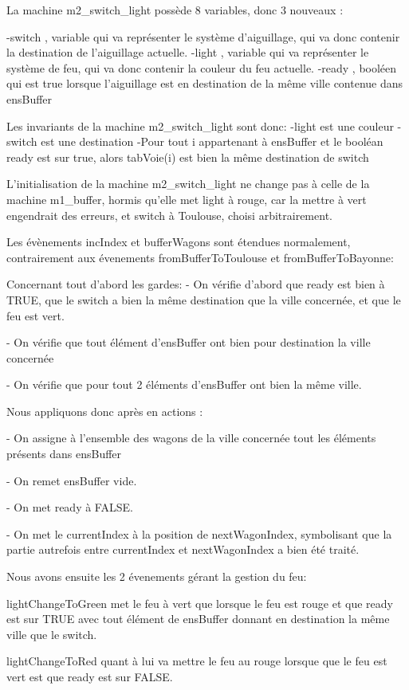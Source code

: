 La machine m2_switch_light possède 8 variables, donc 3 nouveaux :

-switch , variable qui va représenter le système d'aiguillage, qui va donc contenir la destination de l'aiguillage actuelle.
-light  , variable qui va représenter le système de feu, qui va donc contenir la couleur du feu actuelle.
-ready  , booléen qui est true lorsque l'aiguillage est en destination de la même ville contenue dans ensBuffer

Les invariants de la machine m2_switch_light sont donc:
    -light est une couleur
    -switch est une destination
    -Pour tout i appartenant à ensBuffer et le booléan ready est sur true, alors tabVoie(i) est bien la même destination de switch

L'initialisation de la machine m2_switch_light ne change pas à celle de la machine m1_buffer, hormis qu'elle met light à rouge, car la mettre à vert engendrait des erreurs, et switch à Toulouse, choisi arbitrairement.

Les évènements incIndex et bufferWagons sont étendues normalement, contrairement aux évenements fromBufferToToulouse et fromBufferToBayonne:

Concernant tout d'abord les gardes:
- On vérifie d'abord que ready est bien à TRUE, que le switch a bien la même destination que la ville concernée, et que le feu est vert.

- On vérifie que tout élément d'ensBuffer ont bien pour destination la ville concernée

- On vérifie que pour tout 2  éléments d'ensBuffer ont bien la même ville.

Nous appliquons donc après en actions :

- On assigne à l'ensemble des wagons de la ville concernée tout les éléments présents dans ensBuffer

- On remet ensBuffer vide.

- On met ready à FALSE.

- On met le currentIndex à la position de nextWagonIndex, symbolisant que la partie autrefois entre currentIndex et nextWagonIndex a bien été traité.

Nous avons ensuite les 2 évenements gérant la gestion du feu:

lightChangeToGreen met le feu à vert que lorsque le feu est rouge et que ready est sur TRUE avec tout élément de ensBuffer donnant en destination la même ville que le switch.

lightChangeToRed quant à lui va mettre le feu au rouge lorsque que le feu est vert est que ready est sur FALSE.

